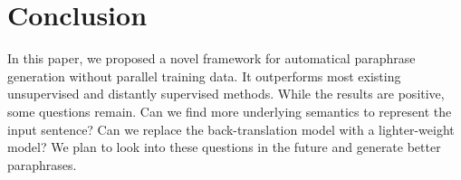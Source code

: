 \section{Conclusion}
In this paper, we proposed a novel framework for automatical paraphrase 
generation without parallel training data. It outperforms most existing 
unsupervised and distantly supervised methods. While the results are positive, 
some questions remain. 
Can we find more underlying semantics to represent the input sentence? Can we replace the back-translation model with a lighter-weight model? 
We plan to look into these questions in the future and generate better paraphrases. 
